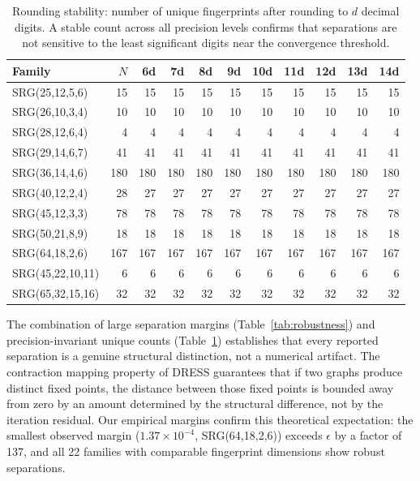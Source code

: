 \documentclass[11pt,a4paper]{article}
\begin{document}
\begin{table}[t]
\centering
\caption{Rounding stability: number of unique fingerprints after rounding to $d$ decimal digits.
A stable count across all precision levels confirms that separations are not sensitive to the least significant digits near the convergence threshold.}
\label{tab:rounding}
\begin{tabular}{@{}lrrrrrrrrrr@{}}
\toprule
Family & $N$ & 6d & 7d & 8d & 9d & 10d & 11d & 12d & 13d & 14d \\
\midrule
SRG(25,12,5,6)   &  15 &  15 &  15 &  15 &  15 &  15 &  15 &  15 &  15 &  15 \\
SRG(26,10,3,4)   &  10 &  10 &  10 &  10 &  10 &  10 &  10 &  10 &  10 &  10 \\
SRG(28,12,6,4)   &   4 &   4 &   4 &   4 &   4 &   4 &   4 &   4 &   4 &   4 \\
SRG(29,14,6,7)   &  41 &  41 &  41 &  41 &  41 &  41 &  41 &  41 &  41 &  41 \\
SRG(36,14,4,6)   & 180 & 180 & 180 & 180 & 180 & 180 & 180 & 180 & 180 & 180 \\
SRG(40,12,2,4)   &  28 &  27 &  27 &  27 &  27 &  27 &  27 &  27 &  27 &  27 \\
SRG(45,12,3,3)   &  78 &  78 &  78 &  78 &  78 &  78 &  78 &  78 &  78 &  78 \\
SRG(50,21,8,9)   &  18 &  18 &  18 &  18 &  18 &  18 &  18 &  18 &  18 &  18 \\
SRG(64,18,2,6)   & 167 & 167 & 167 & 167 & 167 & 167 & 167 & 167 & 167 & 167 \\
SRG(45,22,10,11) &   6 &   6 &   6 &   6 &   6 &   6 &   6 &   6 &   6 &   6 \\
SRG(65,32,15,16) &  32 &  32 &  32 &  32 &  32 &  32 &  32 &  32 &  32 &  32 \\
\bottomrule
\end{tabular}
\end{table}

The combination of large separation margins (Table~\ref{tab:robustness}) and precision-invariant unique counts (Table~\ref{tab:rounding}) establishes that every reported separation is a genuine structural distinction, not a numerical artifact.
The contraction mapping property of DRESS guarantees that if two graphs produce distinct fixed points, the distance between those fixed points is bounded away from zero by an amount determined by the structural difference, not by the iteration residual.
Our empirical margins confirm this theoretical expectation: the smallest observed margin ($1.37 \times 10^{-4}$, SRG(64,18,2,6)) exceeds $\epsilon$ by a factor of 137, and all 22 families with comparable fingerprint dimensions show robust separations.
\end{document}

